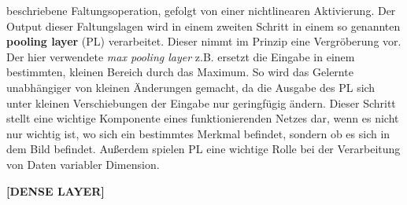 beschriebene Faltungsoperation, gefolgt von einer nichtlinearen Aktivierung.
Der Output dieser Faltungslagen wird in einem zweiten Schritt in einem so
genannten \textbf{pooling layer} (PL) verarbeitet. Dieser nimmt im Prinzip eine
Vergröberung vor. Der hier verwendete \textit{max pooling layer} z.B. ersetzt
die Eingabe in einem bestimmten, kleinen Bereich durch das Maximum. So wird das
Gelernte unabhängiger von kleinen Änderungen gemacht, da die Ausgabe des PL sich
unter kleinen Verschiebungen der Eingabe nur geringfügig ändern. Dieser Schritt
stellt eine wichtige Komponente eines funktionierenden Netzes dar, wenn es
nicht nur wichtig ist, wo sich ein bestimmtes Merkmal befindet, sondern
ob es sich in dem Bild befindet.
Außerdem spielen PL eine wichtige Rolle bei der Verarbeitung von Daten
variabler Dimension.

\textbf{[DENSE LAYER]}
